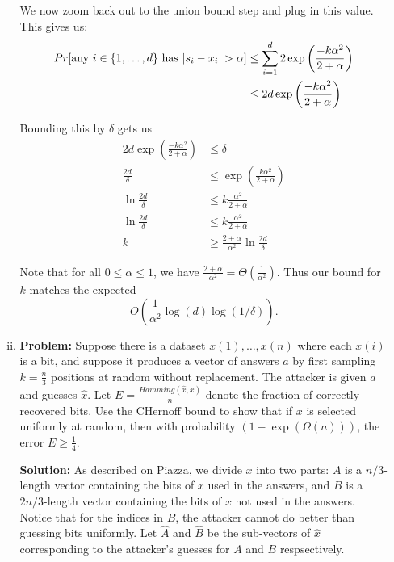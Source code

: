 \begin{enumerate}[(a)]
\begin{enumerate}[(i)]
                We now zoom back out to the union bound step and plug in this value.  This gives us:
                \begin{align*} Pr[\text{any }i \in \{1,\ldots,d\}\text{ has }\vert s_i - x_i \vert >
                    \alpha] &\le \sum_{i=1}^d 2\exp\left( \frac{-k\alpha^2}{2 + \alpha} \right)  \\
                    &\le 2d\exp\left( \frac{-k\alpha^2}{2 + \alpha} \right) 
                \end{align*}

                Bounding this by $\delta$ gets us
                \begin{align*}
                    2d\exp\left( \frac{-k\alpha^2}{2+\alpha} \right) &\le \delta \\
                    \frac{2d}{\delta} &\le \exp\left( \frac{k\alpha^2}{2+\alpha} \right) \\
                    \ln \frac{2d}{\delta} &\le k\frac{\alpha^2}{2+\alpha} \\
                    \ln \frac{2d}{\delta} &\le k\frac{\alpha^2}{2+\alpha} \\
                    k &\ge \frac{2+\alpha}{\alpha^2} \ln \frac{2d}{\delta}
                \end{align*}

                Note that for all $0 \le \alpha \le 1$, we have $\frac{2+\alpha}{\alpha^2} = \Theta\left(
                \frac{1}{\alpha^2} \right)$.  Thus our bound for $k$ matches the expected
                \[ O\left( \frac{1}{\alpha^2}\log(d)\log(1/\delta)\right). \]

            \item \textbf{Problem:} Suppose there is a dataset $x(1), \ldots, x(n)$ where each $x(i)$ is a bit, and suppose it
                produces a vector of answers $a$ by first sampling $k = \frac{n}{3}$ positions at random without
                replacement.  The attacker is given $a$ and guesses $\hat{x}$.  Let $E = \frac{Hamming(\hat{x}, x)}{n}$
                denote the fraction of correctly recovered bits.  Use the CHernoff bound to show that if $x$ is
                selected uniformly at random, then with probability $(1-\exp(\Omega(n)))$, the error $E \ge \frac14$.

                \textbf{Solution:} As described on Piazza, we divide $x$ into two parts: $A$ is a $n/3$-length vector
                containing the bits of $x$ used in the answers, and $B$ is a $2n/3$-length vector containing the bits
                of $x$ not used in the answers.  Notice that for the indices in $B$, the attacker cannot
                do better than guessing bits uniformly.  Let $\hat{A}$ and $\hat{B}$ be the sub-vectors of $\hat{x}$
                corresponding to the attacker's guesses for $A$ and $B$ respsectively.


\end{enumerate}
\end{enumerate}
